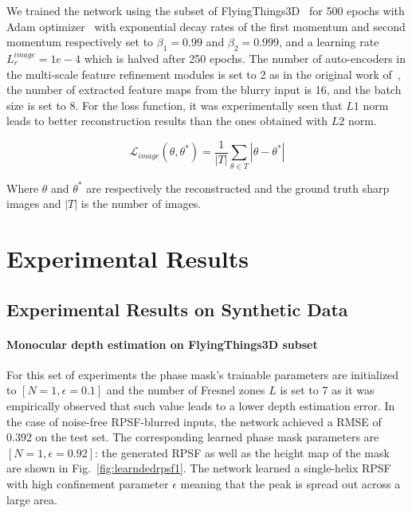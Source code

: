 \documentclass[preprint,5p,twocolumn]{elsarticle}
\begin{document}
We trained the network using the subset of FlyingThings3D~\cite{MIFDB16} for 500 epochs with Adam optimizer~\cite{kingma2014adam} with exponential decay rates of the first momentum and second momentum respectively set to $\beta_{1}=0.99$ and $\beta_{2}=0.999$, and a learning rate $L_r^{image}= 1e-4$ which is halved after 250 epochs. The number of auto-encoders in the multi-scale feature refinement modules is set to 2 as in the original work of~\cite{dong2021deep},  the number of extracted feature maps from the blurry input is 16, and the batch size is set to 8. For the loss function, it was experimentally seen that $L{1}$ norm leads to better reconstruction results than the ones obtained with $L{2}$ norm.  

\begin{equation}
    \mathcal{L}_{image} (\theta,\theta^{*}) =\frac{1}{|T|}\sum_{\theta\in T}|\theta-\theta^{*}|
\end{equation}

Where $\theta$ and $\theta^{*}$ are respectively the reconstructed and the ground truth sharp images and $|T|$ is the number of images.
 

\section{Experimental Results}
\label{sec:results}





\subsection{Experimental Results on Synthetic Data}
\label{subsec:depth_results}


\paragraph{Monocular depth estimation on FlyingThings3D subset}
For this set of experiments the phase mask's trainable parameters are initialized to $[N=1,\epsilon=0.1]$ and the number of Fresnel zones $L$ is set to 7 as it was empirically observed that such value leads to a lower depth estimation error. In the case of noise-free RPSF-blurred inputs, the network achieved a RMSE of 0.392 on the test set. The corresponding learned phase mask parameters are $[N=1,\epsilon=0.92]$: the generated RPSF as well as the height map of the mask are shown in Fig.~\ref{fig:learndedrpsf1}. The network learned a single-helix RPSF with high confinement parameter $\epsilon$ meaning that the peak is spread out across a large area.
\end{document}
